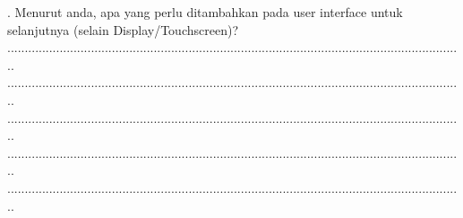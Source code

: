 \documentclass[12pt,]{article}
\begin{document}
	. Menurut anda, apa yang perlu ditambahkan pada user interface untuk selanjutnya (selain Display/Touchscreen)?\\
	...................................................................................................................................\\
	...................................................................................................................................\\
	...................................................................................................................................\\
	...................................................................................................................................\\
	...................................................................................................................................\\
	
\end{document}

